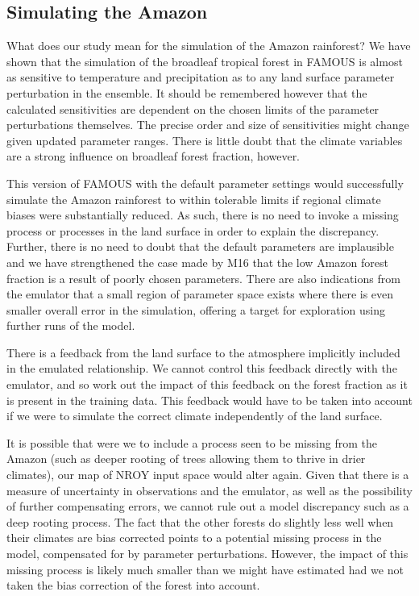 \documentclass[gmd, manuscript]{copernicus}
\begin{document}
\subsection{Simulating the Amazon}
What does our study mean for the simulation of the Amazon rainforest? We have shown that the simulation of the broadleaf tropical forest in FAMOUS is almost as sensitive to temperature and precipitation as to any land surface parameter perturbation in the ensemble. It should be remembered however that the calculated sensitivities are dependent on the chosen limits of the parameter perturbations themselves. The precise order and size of sensitivities might change given updated parameter ranges. There is little doubt that the climate variables are a strong influence on broadleaf forest fraction, however. 

This version of FAMOUS with the default parameter settings would successfully simulate the Amazon rainforest to within tolerable limits if regional climate biases were substantially reduced. As such, there is no need to invoke a missing process or processes in the land surface in order to explain the discrepancy. Further, there is no need to doubt that the default parameters are implausible and we have strengthened the case made by M16 that the low Amazon forest fraction is a result of poorly chosen parameters. There are also indications from the emulator that a small region of parameter space exists where there is even smaller overall error in the simulation, offering a target for exploration using further runs of the model.
 
There is a feedback from the land surface to the atmosphere implicitly included in the emulated relationship. We cannot control this feedback directly with the emulator, and so work out the impact of this feedback on the forest fraction as it is present in the training data. This feedback would have to be taken into account if we were to simulate the correct climate independently of the land surface.

It is possible that were we to include a process seen to be missing from the Amazon (such as deeper rooting of trees allowing them to thrive in drier climates), our map of NROY input space would alter again. Given that there is a measure of uncertainty in observations and the emulator, as well as the possibility of further compensating errors, we cannot rule out a model discrepancy such as a deep rooting process. The fact that the other forests do slightly less well when their climates are bias corrected points to a potential missing process in the model, compensated for by parameter perturbations. However, the impact of this missing process is likely much smaller than we might have estimated had we not taken the bias correction of the forest into account.
\end{document}
